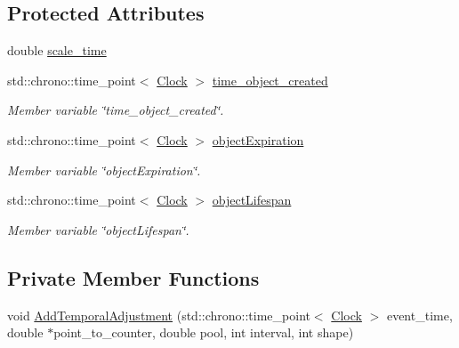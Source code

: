 \subsection*{Protected Attributes}
\begin{DoxyCompactItemize}
\item 
double \mbox{\hyperlink{classDimension_ad3ba9c1c332756658b1e711c447831a3}{scale\+\_\+time}}
\item 
std\+::chrono\+::time\+\_\+point$<$ \mbox{\hyperlink{universe_8h_a0ef8d951d1ca5ab3cfaf7ab4c7a6fd80}{Clock}} $>$ \mbox{\hyperlink{classDimension_a99ba1a7fe44c7e52520144ab4793cad3}{time\+\_\+object\+\_\+created}}
\begin{DoxyCompactList}\small\item\em Member variable \char`\"{}time\+\_\+object\+\_\+created\char`\"{}. \end{DoxyCompactList}\item 
std\+::chrono\+::time\+\_\+point$<$ \mbox{\hyperlink{universe_8h_a0ef8d951d1ca5ab3cfaf7ab4c7a6fd80}{Clock}} $>$ \mbox{\hyperlink{classDimension_ac2df45c101a97359cfe179636f62b0f2}{object\+Expiration}}
\begin{DoxyCompactList}\small\item\em Member variable \char`\"{}object\+Expiration\char`\"{}. \end{DoxyCompactList}\item 
std\+::chrono\+::time\+\_\+point$<$ \mbox{\hyperlink{universe_8h_a0ef8d951d1ca5ab3cfaf7ab4c7a6fd80}{Clock}} $>$ \mbox{\hyperlink{classDimension_a249074ae65a06cb5386baf196bdee022}{object\+Lifespan}}
\begin{DoxyCompactList}\small\item\em Member variable \char`\"{}object\+Lifespan\char`\"{}. \end{DoxyCompactList}\end{DoxyCompactItemize}
\subsection*{Private Member Functions}
\begin{DoxyCompactItemize}
\item 
void \mbox{\hyperlink{classDimension_a278d8c3df7896eb01c55283482f8674a}{Add\+Temporal\+Adjustment}} (std\+::chrono\+::time\+\_\+point$<$ \mbox{\hyperlink{universe_8h_a0ef8d951d1ca5ab3cfaf7ab4c7a6fd80}{Clock}} $>$ event\+\_\+time, double $\ast$point\+\_\+to\+\_\+counter, double pool, int interval, int shape)
\end{DoxyCompactItemize}
